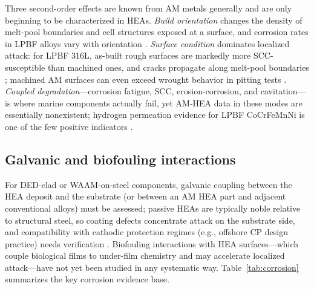 Three second-order effects are known from AM metals generally and are only beginning to be characterized in HEAs. \emph{Build orientation} changes the density of melt-pool boundaries and cell structures exposed at a surface, and corrosion rates in LPBF alloys vary with orientation \cite{han2025,cagirici2024}. \emph{Surface condition} dominates localized attack: for LPBF 316L, as-built rough surfaces are markedly more SCC-susceptible than machined ones, and cracks propagate along melt-pool boundaries \cite{lpbf_316l_scc2022}; machined AM surfaces can even exceed wrought behavior in pitting tests \cite{nass2025marine}. \emph{Coupled degradation}---corrosion fatigue, SCC, erosion-corrosion, and cavitation---is where marine components actually fail, yet AM-HEA data in these modes are essentially nonexistent; hydrogen permeation evidence for LPBF CoCrFeMnNi is one of the few positive indicators \cite{lpbf_cantor_2024}.

\subsection{Galvanic and biofouling interactions}

For DED-clad or WAAM-on-steel components, galvanic coupling between the HEA deposit and the substrate (or between an AM HEA part and adjacent conventional alloys) must be assessed; passive HEAs are typically noble relative to structural steel, so coating defects concentrate attack on the substrate side, and compatibility with cathodic protection regimes (e.g., offshore CP design practice) needs verification \cite{nass2025marine}. Biofouling interactions with HEA surfaces---which couple biological films to under-film chemistry and may accelerate localized attack---have not yet been studied in any systematic way. Table~\ref{tab:corrosion} summarizes the key corrosion evidence base.
